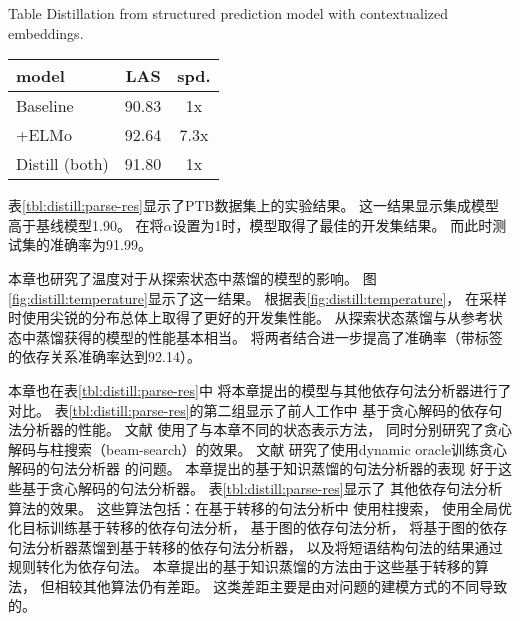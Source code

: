 \begin{table}[t]
	{Table $\!$}{Distillation from structured prediction model with contextualized embeddings.\label{tbl:elmo-tb-parser}}
	\vspace{0.5em}\centering\wuhao
	\begin{tabular}{lcc}
		\toprule[1.5pt]
		model & LAS & spd. \\
		\midrule[1pt]
		Baseline & 90.83 & 1x \\
		\quad +ELMo & 92.64 & 7.3x \\
		Distill (both) & 91.80 & 1x \\
		\bottomrule[1.5pt]
	\end{tabular}
\end{table}

表\ref{tbl:distill:parse-res}显示了PTB数据集上的实验结果。
这一结果显示集成模型高于基线模型1.90。
在将$\alpha$设置为1时，模型取得了最佳的开发集结果。
而此时测试集的准确率为91.99。

本章也研究了温度对于从探索状态中蒸馏的模型的影响。
图\ref{fig:distill:temperature}显示了这一结果。
根据表\ref{fig:distill:temperature}，
在采样时使用尖锐的分布总体上取得了更好的开发集性能。
从探索状态蒸馏与从参考状态中蒸馏获得的模型的性能基本相当。
将两者结合进一步提高了准确率（带标签的依存关系准确率达到92.14）。

本章也在表\ref{tbl:distill:parse-res}中
将本章提出的模型与其他依存句法分析器进行了对比。
表\ref{tbl:distill:parse-res}的第二组显示了前人工作中
基于贪心解码的依存句法分析器的性能。
文献
使用了与本章不同的状态表示方法，
同时分别研究了贪心解码与柱搜索（beam-search）的效果。
文献
研究了使用dynamic oracle训练贪心解码的句法分析器
的问题。
本章提出的基于知识蒸馏的句法分析器的表现
好于这些基于贪心解码的句法分析器。
表\ref{tbl:distill:parse-res}显示了
其他依存句法分析算法的效果。
这些算法包括：在基于转移的句法分析中
使用柱搜索\cite{buckman-ballesteros-dyer:2016:EMNLP2016,andor-EtAl:2016:P16-1}，
使用全局优化目标训练基于转移的依存句法分析\cite{andor-EtAl:2016:P16-1}，
基于图的依存句法分析\cite{DBLP:journals/corr/DozatM16}，
将基于图的依存句法分析器蒸馏到基于转移的依存句法分析器\cite{kuncoro-16}，
以及将短语结构句法的结果通过规则转化为依存句法\cite{kuncoro-17}。
本章提出的基于知识蒸馏的方法由于这些基于转移的算法，
但相较其他算法仍有差距。
这类差距主要是由对问题的建模方式的不同导致的。

